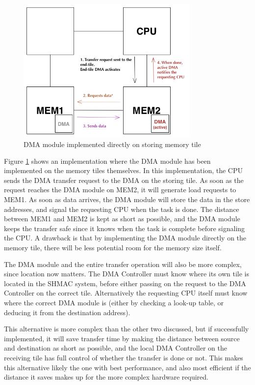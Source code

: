 \begin{figure}[h!]
    \centering
    \includegraphics[width=0.8\textwidth]{Figures/DMA/DMASHMAC3}
    \caption{DMA module implemented directly on storing memory tile}
    \label{fig:DMASHMAC3}
\end{figure}
 
Figure \ref{fig:DMASHMAC3} shows an implementation where the DMA module has been implemented on the memory tiles themselves.
In this implementation, the CPU sends the DMA transfer request to the DMA on the storing tile.
As soon as the request reaches the DMA module on MEM2, it will generate load requests to MEM1.
As soon as data arrives, the DMA module will store the data in the store addresses, and signal the requesting CPU when the task is done.
The distance between MEM1 and MEM2 is kept as short as possible, and the DMA module keeps the transfer safe since it knows when the task is complete before signaling the CPU.
A drawback is that by implementing the DMA module directly on the memory tile, there will be less potential room for the memory size itself.

The DMA module and the entire transfer operation will also be more complex, since location now matters.
The DMA Controller must know where its own tile is located in the SHMAC system, before either passing on the request to the DMA Controller on the correct tile.
Alternatively the requesting CPU itself must know where the correct DMA module is (either by checking a look-up table, or deducing it from the destination address).

This alternative is more complex than the other two discussed, but if successfully implemented, it will save transfer time by making the distance between source and destination as short as possible, and the local DMA Controller on the receiving tile has full control of whether the transfer is done or not.
This makes this alternative likely the one with best performance, and also most efficient if the distance it saves makes up for the more complex hardware required.

